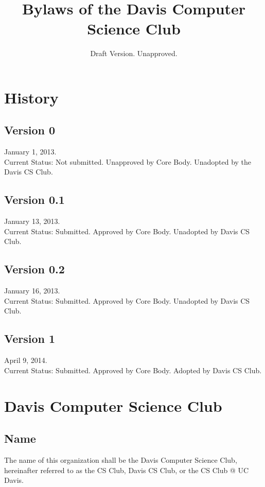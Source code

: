 \documentclass{article}
\title{Bylaws of the Davis Computer Science Club}
\author{}
\date{Draft Version. Unapproved.}
\begin{document}

\begin{titlepage}
	\maketitle
\end{titlepage}

\pagebreak

\section*{History}
\subsection*{Version 0}
January 1, 2013.\\
Current Status: Not submitted. Unapproved by Core Body. Unadopted by the Davis CS Club.
\subsection*{Version 0.1}
January 13, 2013.\\
Current Status: Submitted. Approved by Core Body. Unadopted by Davis CS Club.
\subsection*{Version 0.2}
January 16, 2013.\\
Current Status: Submitted. Approved by Core Body. Unadopted by Davis CS Club.
\subsection*{Version 1}
April 9, 2014.\\
Current Status: Submitted. Approved by Core Body. Adopted by Davis CS Club.

\pagebreak

\tableofcontents

\pagebreak

\singlespacing
\sectionfont{\Large}
\subsectionfont{\large}

\section{Davis Computer Science Club}
\subsection{Name}
The name of this organization shall be the Davis Computer Science Club, hereinafter referred to as the CS Club, Davis CS Club, or the CS Club @ UC Davis.
\end{document}
